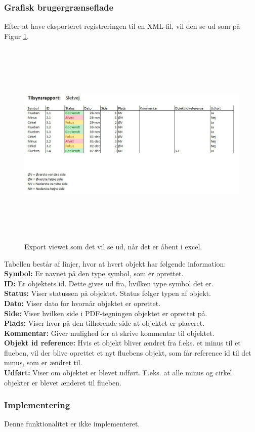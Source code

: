 \subsubsection{Grafisk brugergrænseflade}
Efter at have eksporteret registreringen til en XML-fil, vil den se ud som på Figur \ref{fig:Excel}.
\begin{figure}[H] %
	\centering
	\includegraphics[height=10cm, width=17cm]{../ArkitekturDesign/Design/Eksportering/Excel}
	\caption{Export viewet som det vil se ud, når det er åbent i excel.}
	\label{fig:Excel}
\end{figure}
Tabellen består af linjer, hvor at hvert objekt har følgende information: \\
\textbf{Symbol:} Er navnet på den type symbol, som er oprettet. \\
\textbf{ID:} Er objektets id. Dette gives ud fra, hvilken type symbol det er. \\
\textbf{Status:} Viser statussen på objektet. Status følger typen af objekt. \\
\textbf{Dato:} Viser dato for hvornår objektet er oprettet. \\
\textbf{Side:} Viser hvilken side i PDF-tegningen objektet er oprettet på. \\
\textbf{Plads:} Viser hvor på den tilhørende side at objektet er placeret. \\
\textbf{Kommentar:} Giver mulighed for at skrive kommentar til objektet. \\
\textbf{Objekt id reference:} Hvis et objekt bliver ændret fra f.eks. et minus til et flueben, vil der blive oprettet et nyt fluebens objekt, som får reference id til det minus, som er ændret til. \\
\textbf{Udført:} Viser om objektet er blevet udført. F.eks. at alle minus og cirkel objekter er blevet ænderet til flueben. \\

\subsubsection{Implementering}
Denne funktionalitet er ikke implementeret.

\clearpage